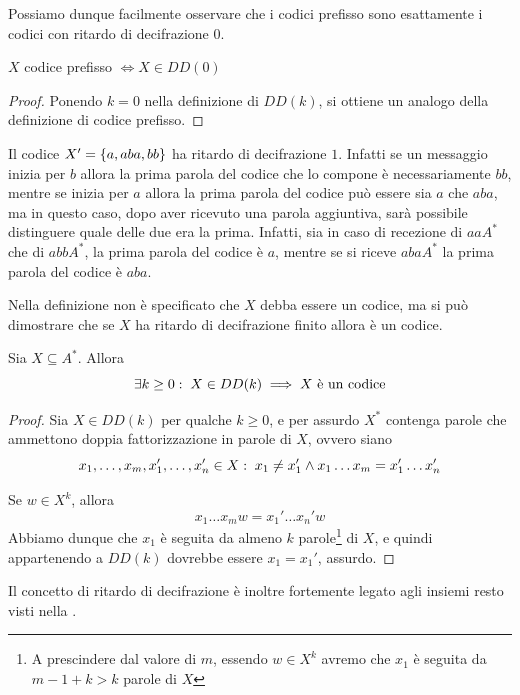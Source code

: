 Possiamo dunque facilmente osservare che i codici prefisso sono esattamente i codici con ritardo di decifrazione \(0\).
\begin{proposition}{}
  \(X\) codice prefisso \(\iff X \in DD(0)\)
\end{proposition}

\begin{proof}
  Ponendo \(k=0\) nella definizione di \(DD(k)\), si ottiene un analogo della definizione di codice prefisso.
\end{proof}

\begin{example}{}
  Il codice \(X' = \set{a,aba,bb}\) ha ritardo di decifrazione \(1\).
  Infatti se un messaggio inizia per \(b\) allora la prima parola del codice che lo compone
  è necessariamente \(bb\), mentre se inizia per \(a\) allora la prima parola del codice può essere sia 
  \(a\) che \(aba\), ma in questo caso, dopo aver ricevuto una parola aggiuntiva, sarà possibile distinguere
  quale delle due era la prima.
  Infatti, sia in caso di recezione di \(aaA^*\) che di \(abbA^*\), la prima parola del codice è \(a\), mentre se si riceve \(abaA^*\) la prima parola del codice è \(aba\).
\end{example}

Nella definizione non è specificato che \(X\) debba essere un codice, ma si può dimostrare che se \(X\) ha ritardo di decifrazione finito allora è un codice.

\begin{proposition}{}
  Sia \(X \subseteq A^*\). Allora
  \[\exists k \geq 0 :\; X \in DD(k) \implies X \text{ è un codice}\]
\end{proposition}

\begin{proof}
  Sia \(X \in DD(k)\) per qualche \(k \geq 0\), e per assurdo \(X^*\) contenga parole che ammettono doppia fattorizzazione in parole di \(X\), ovvero siano
  \[x_1,\ldots,x_m,x_1',\ldots,x_n' \in X :\; x_1\neq x_1' \land x_1\ldots x_m = x_1'\ldots x_n'\]

  Se \(w \in X^k\), allora
  \[x_1\ldots x_m w = x_1'\ldots x_n' w\]
  Abbiamo dunque che \(x_1\) è seguita da almeno \(k\) parole\footnote{A prescindere dal valore di \(m\), essendo \(w \in X^k\) avremo che \(x_1\) è seguita da \(m-1+k>k\) parole di \(X\)} di \(X\), e quindi appartenendo a \(DD(k)\) dovrebbe essere \(x_1 = x_1'\), assurdo.
\end{proof}

Il concetto di ritardo di decifrazione è inoltre fortemente legato agli insiemi resto visti nella .

